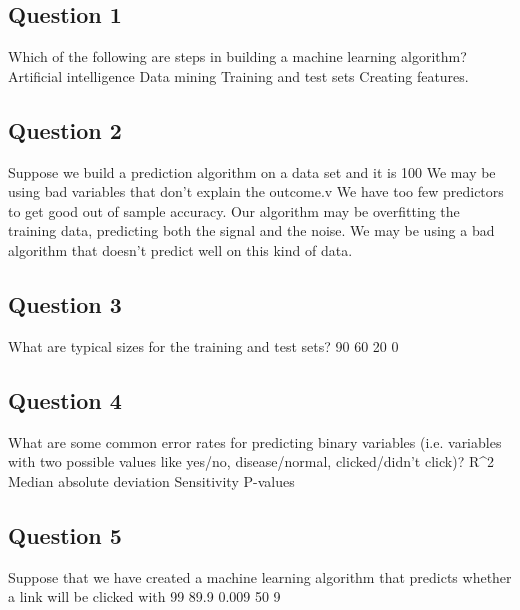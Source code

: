 \subsection{Question 1}
Which of the following are steps in building a machine learning algorithm?
Artificial intelligence
Data mining
Training and test sets
Creating features.
\subsection{Question 2}
Suppose we build a prediction algorithm on a data set and it is 100%
We may be using bad variables that don't explain the outcome.v
We have too few predictors to get good out of sample accuracy.
Our algorithm may be overfitting the training data, predicting both the signal and the noise.
We may be using a bad algorithm that doesn't predict well on this kind of data.
\subsection{Question 3}
What are typical sizes for the training and test sets?
90%
60%
20%
0%
\subsection{Question 4}
What are some common error rates for predicting binary variables (i.e. variables with two possible values like yes/no, disease/normal, clicked/didn't click)?
R^2
Median absolute deviation
Sensitivity
P-values
\subsection{Question 5}
Suppose that we have created a machine learning algorithm that predicts whether a link will be clicked with 99%
89.9%
0.009%
50%
9%
